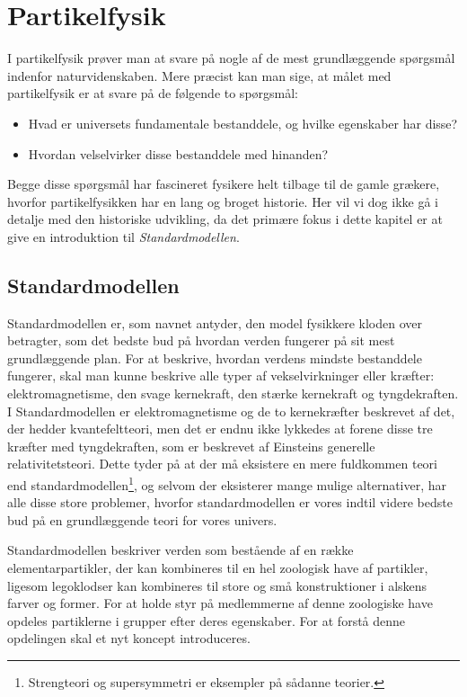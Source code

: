 \chapter{Partikelfysik} \label{chap:Partikelfysik}

I partikelfysik prøver man at svare på nogle af de mest grundlæggende spørgsmål indenfor naturvidenskaben. Mere præcist kan man sige, at målet med partikelfysik er at svare på de følgende to spørgsmål:
\begin{itemize}
    \item Hvad er universets fundamentale bestanddele, og hvilke egenskaber har disse?
    \item Hvordan velselvirker disse bestanddele med hinanden?
\end{itemize}

Begge disse spørgsmål har fascineret fysikere helt tilbage til de gamle grækere, hvorfor partikelfysikken har en lang og broget historie. Her vil vi dog ikke gå i detalje med den historiske udvikling, da det primære fokus i dette kapitel er at give en introduktion til \emph{Standardmodellen}. 

\section{Standardmodellen}

Standardmodellen er, som navnet antyder, den model fysikkere kloden over betragter, som det bedste bud på hvordan verden fungerer på sit mest grundlæggende plan. For at beskrive, hvordan verdens mindste bestanddele fungerer, skal man kunne beskrive alle typer af vekselvirkninger eller kræfter: elektromagnetisme, den svage kernekraft, den stærke kernekraft og tyngdekraften. I Standardmodellen er elektromagnetisme og de to kernekræfter beskrevet af det, der hedder kvantefeltteori, men det er endnu ikke lykkedes at forene disse tre kræfter med tyngdekraften, som er beskrevet af Einsteins generelle relativitetsteori. Dette tyder på at der må eksistere en mere fuldkommen teori end standardmodellen\footnote{Strengteori og supersymmetri er eksempler på sådanne teorier.}, og selvom der eksisterer mange mulige alternativer, har alle disse store problemer, hvorfor standardmodellen er vores indtil videre bedste bud på en grundlæggende teori for vores univers. 

Standardmodellen beskriver verden som bestående af en række elementarpartikler, der kan kombineres til en hel zoologisk have af partikler, ligesom legoklodser kan kombineres til store og små konstruktioner i alskens farver og former. For at holde styr på medlemmerne af denne zoologiske have opdeles partiklerne i grupper efter deres egenskaber. For at forstå denne opdelingen skal et nyt koncept introduceres.

